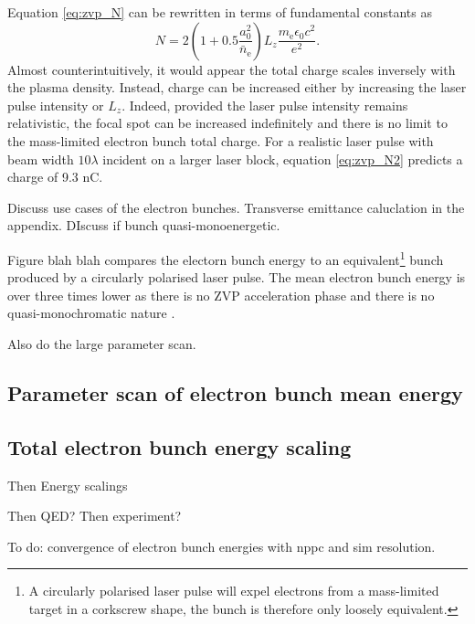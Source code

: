 Equation \ref{eq:zvp_N} can be rewritten in terms of fundamental constants as
\begin{equation}\label{eq:zvp_N2}
	N = 2 (1+0.5\frac{a^2_0}{\bar{n}_\mathrm{e}}) L_z \frac{m_\mathrm{e}\epsilon_0c^2}{e^2}.
\end{equation}
Almost counterintuitively, it would appear the total charge scales inversely with the plasma density. Instead, charge can be increased either by increasing the laser pulse intensity or $L_z$. Indeed, provided the laser pulse intensity remains relativistic, the focal spot can be increased indefinitely and there is no limit to the mass-limited electron bunch total charge. For a realistic laser pulse with beam width $10 \lambda$ incident on a larger laser block, equation \ref{eq:zvp_N2} predicts a charge of 9.3 nC.


Discuss use cases of the electron bunches.
Transverse emittance caluclation in the appendix.
DIscuss if  bunch quasi-monoenergetic.

Figure blah blah compares the electorn bunch energy to an equivalent\footnote{A circularly polarised laser pulse will expel electrons from a mass-limited target in a corkscrew shape, the bunch is therefore only loosely equivalent.} bunch produced by a circularly polarised laser pulse. The mean electron bunch energy is over three times lower as there is no ZVP acceleration phase and there is no quasi-monochromatic nature \cite{baevaZeroVectorPotential2011}. 

Also do the large parameter scan.

\subsection{Parameter scan of electron bunch mean energy}

\subsection{Total electron bunch energy scaling}


Then Energy scalings

Then QED?
Then experiment?


To do: convergence of electron bunch energies with nppc and sim resolution.

